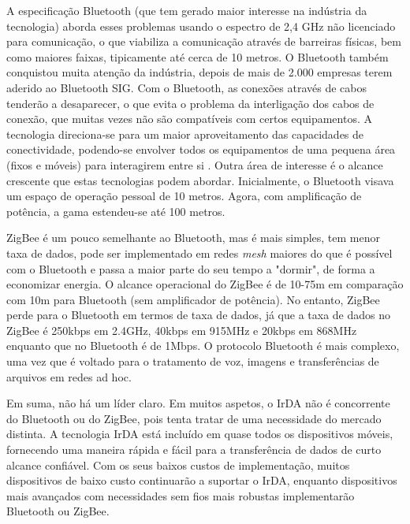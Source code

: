 \documentclass[conference]{IEEEtran}
\begin{document}
A especificação Bluetooth (que tem gerado maior interesse na indústria da tecnologia) aborda esses problemas usando o espectro de 2,4 GHz não licenciado para comunicação, o que viabiliza a comunicação através de barreiras físicas, bem como maiores faixas, tipicamente até cerca de 10 metros. O Bluetooth também conquistou muita atenção da indústria, depois de mais de 2.000 empresas terem aderido ao Bluetooth SIG. Com o Bluetooth, as conexões através de cabos tenderão a desaparecer, o que evita o problema da interligação dos cabos de conexão, que muitas vezes não são compatíveis com certos equipamentos. A tecnologia direciona-se para um maior aproveitamento das capacidades de conectividade, podendo-se envolver todos os equipamentos de uma pequena área (fixos e móveis) para interagirem entre si \cite{kobayashi2004tecnologia}. Outra área de interesse é o alcance crescente que estas tecnologias podem abordar. Inicialmente, o Bluetooth visava um espaço de operação pessoal de 10 metros. Agora, com amplificação de potência, a gama estendeu-se até 100 metros.

ZigBee é um pouco semelhante ao Bluetooth, mas é mais simples, tem menor taxa de dados, pode ser implementado em redes \textit{mesh} maiores do que é possível com o Bluetooth e passa a maior parte do seu tempo a "dormir", de forma a economizar energia. O alcance operacional do ZigBee é de 10-75m em comparação com 10m para Bluetooth (sem amplificador de potência). No entanto, ZigBee perde para o Bluetooth em termos de taxa de dados, já que a taxa de dados no ZigBee é 250kbps em 2.4GHz, 40kbps em 915MHz e 20kbps em 868MHz enquanto que no Bluetooth é de 1Mbps. O protocolo Bluetooth é mais complexo, uma vez que é voltado para o tratamento de voz, imagens e transferências de arquivos em redes ad hoc. 

Em suma, não há um líder claro. Em muitos aspetos, o IrDA não é concorrente do Bluetooth ou do ZigBee, pois tenta tratar de uma necessidade do mercado distinta. A tecnologia IrDA está incluído em quase todos os dispositivos móveis, fornecendo uma maneira rápida e fácil para a transferência de dados de curto alcance confiável. Com os seus baixos custos de implementação, muitos dispositivos de baixo custo continuarão a suportar o IrDA, enquanto dispositivos mais avançados com necessidades sem fios mais robustas implementarão Bluetooth ou ZigBee.

{}

\end{document}
